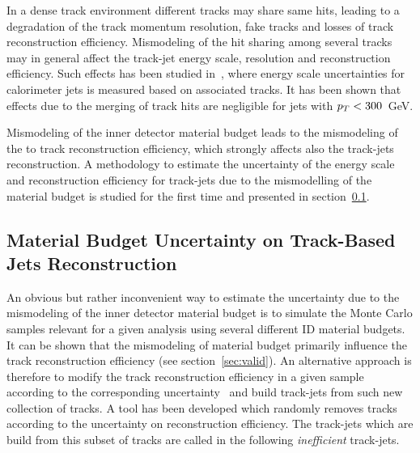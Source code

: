In a dense track environment  different tracks may share 
same hits, leading to a degradation of the track momentum resolution, fake tracks and losses of track reconstruction
efficiency. Mismodeling of the hit sharing among several tracks may in general affect the 
track-jet energy scale, resolution and reconstruction efficiency. 
Such effects has been studied in~\cite{JEStrack}, where energy scale uncertainties for  calorimeter jets is 
measured based on associated tracks. It has been shown that effects due to the merging of track hits are negligible 
for jets with $p_{T} < 300$~GeV.

Mismodeling of the inner detector material budget leads to the mismodeling of the 
to track reconstruction efficiency, which strongly affects also the track-jets reconstruction.
A methodology to estimate the uncertainty of the energy scale and reconstruction efficiency for track-jets due to the
mismodelling of the material budget is studied for the first time and presented in section~\ref{sec:trackExMat}.


\subsection{Material Budget Uncertainty on Track-Based Jets Reconstruction } \label{sec:trackExMat} %
An obvious but rather inconvenient way to estimate the uncertainty due to the mismodeling of the 
inner detector material budget is to simulate the  Monte Carlo samples relevant for a given analysis 
using several different ID material budgets.
It can be shown that the mismodeling of material budget primarily influence the
track reconstruction efficiency (see section~\ref{sec:valid}). An alternative approach is therefore to
modify the track reconstruction efficiency in a given sample according to the corresponding uncertainty~\cite{IDMaterial,trackEff} and build 
track-jets from such  new collection of tracks.
A tool has been developed which randomly removes tracks according to the uncertainty on  reconstruction efficiency. 
The track-jets which are build from  this subset of tracks are called in the
following \emph{inefficient} track-jets. 

